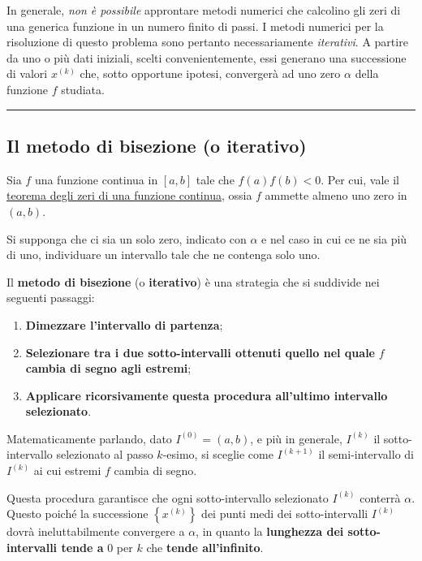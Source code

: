 \documentclass[a4paper]{article}
\newcommand{\longline}{\noindent\rule{\textwidth}{0.4pt}}
\newcommand{\definition}[1]{\textcolor{Red3}{\textbf{#1}}\index{#1}}
\newcommand{\highspace}{\vspace{1.2em}\noindent}
\begin{document}
    \highspace
    In generale, \emph{non è possibile} approntare metodi numerici che calcolino gli zeri di una generica funzione in un numero finito di passi. I metodi numerici per la risoluzione di questo problema sono pertanto necessariamente \emph{iterativi}. A partire da uno o più dati iniziali, scelti convenientemente, essi generano una successione di valori $x^{\left(k\right)}$ che, sotto opportune ipotesi, convergerà ad uno zero $\alpha$ della funzione $f$ studiata.

    \longline

    \subsection{Il metodo di bisezione (o iterativo)}

    Sia $f$ una funzione continua in $\left[a,b\right]$ tale che $f\left(a\right)f\left(b\right) < 0$. Per cui, vale il \href{https://www.youmath.it/lezioni/analisi-matematica/limiti-continuita-e-asintoti/723-teorema-degli-zeri.html}{teorema degli zeri di una funzione continua}, ossia $f$ ammette almeno uno zero in $\left(a,b\right)$.

    \highspace
    Si supponga che ci sia un solo zero, indicato con $\alpha$ e nel caso in cui ce ne sia più di uno, individuare un intervallo tale che ne contenga solo uno.

    \highspace
    Il \definition{metodo di bisezione} (o \textbf{iterativo}) è una strategia che si suddivide nei seguenti passaggi:
    \begin{enumerate}
        \item \textbf{Dimezzare l'intervallo di partenza};
        \item \textbf{Selezionare tra i due sotto-intervalli ottenuti quello nel quale} $f$ \textbf{cambia di segno agli estremi};
        \item \textbf{Applicare ricorsivamente questa procedura all'ultimo intervallo selezionato}.
    \end{enumerate}

    \highspace
    Matematicamente parlando, dato $I^{(0)} = \left(a,b\right)$, e più in generale, $I^{(k)}$ il sotto-intervallo selezionato al passo $k$-esimo, si sceglie come $I^{\left(k+1\right)}$ il semi-intervallo di $I^{(k)}$ ai cui estremi $f$ cambia di segno.

    \highspace
    Questa procedura garantisce che ogni sotto-intervallo selezionato $I^{(k)}$ conterrà $\alpha$. Questo poiché la successione $\left\{x^{(k)}\right\}$ dei punti medi dei sotto-intervalli $I^{(k)}$ dovrà ineluttabilmente convergere a $\alpha$, in quanto la \textbf{lunghezza dei sotto-intervalli tende a} $0$ per $k$ che \textbf{tende all'infinito}.
\end{document}
